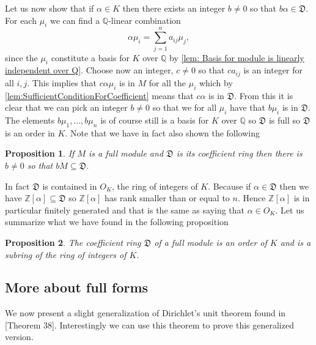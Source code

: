 \documentclass{article}
\newtheorem{proposition}{Proposition}[section]
\newcommand{\mfrak}[1]{\mathfrak{#1}}
\newcommand{\mcal}[1]{\mathcal{#1}}
\newcommand{\mbb}[1]{\mathbb{#1}}
\numberwithin{equation}{section}
\begin{document}
Let us now show that if $\alpha \in K$ then there exists an integer $b \neq 0$ so that $b \alpha \in \mfrak D$. For each $\mu_i$ we can find a $\mbb Q$-linear combination
$$\alpha \mu_i = \sum_{j=1}^n a_{ij} \mu_j,$$
since the $\mu_i$ constitute a basis for $K$ over $\mbb Q$ by \cref{lem: Basis for module is linearly independent over Q}. Choose now an integer, $c \neq 0$ so that $c a_{ij}$ is an integer for all $i,j$. This implies that $c \alpha \mu_i$ is in $M$ for all the $\mu_i$ which by \cref{lem:SufficientConditionForCoefficient} means that $c \alpha$ is in $\mfrak D$. From this it is clear that we can pick an integer $b \neq 0$ so that we for all $\mu_i$ have that $b \mu_i$ is in $\mfrak D$. The elements $b \mu_1, ..., b\mu_n$ is of course still is a basis for $K$ over $\mbb Q$ so $\mfrak D$ is full so $\mfrak D$ is an order in $K$. Note that we have in fact also shown the following
\begin{proposition}\label{bM contained in D}
    If $M$ is a full module and $\mfrak D$ is its coefficient ring then there is $b \neq 0$ so that $bM \subseteq \mfrak D$.
\end{proposition}
In fact $\mfrak D$ is contained in $O_K$, the ring of integers of $K$. Because if $\alpha \in \mfrak D$ then we have $\mbb Z[\alpha] \subseteq \mfrak D$ so $\mbb Z[\alpha]$ has rank smaller than or equal to $n$. Hence $\mbb Z[\alpha]$ is in particular finitely generated and that is the same as saying that $\alpha \in O_K$. Let us summarize what we have found in the following proposition
\begin{proposition}\label{prop: Coefficient ring properties}
    The coefficient ring $\mfrak D$ of a full module is an order of $K$ and is a subring of the ring of integers of $K$.
\end{proposition}

\subsection{More about full forms}
We now present a slight generalization of Dirichlet's unit theorem found in \citep{marcus}[Theorem 38]. Interestingly we can use this theorem to prove this generalized version.
\end{document}
